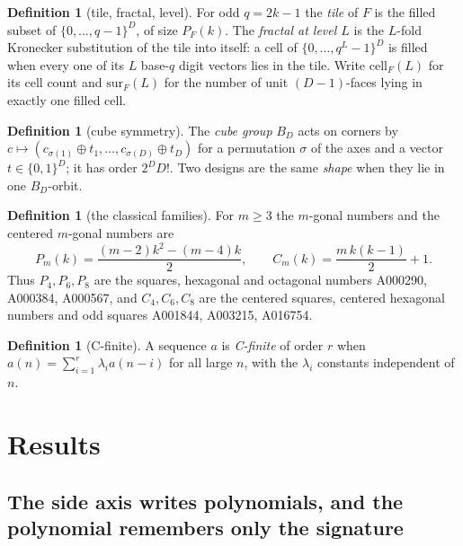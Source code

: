 \documentclass[11pt]{amsart}
\theoremstyle{definition}
\newtheorem{definition}[theorem]{Definition}
\theoremstyle{remark}
\begin{document}
\begin{definition}[tile, fractal, level]
\label{def:level}
For odd $q = 2k-1$ the \emph{tile} of $F$ is the filled subset of $\{0,\dots,q-1\}^{D}$, of size $P_{F}(k)$. The \emph{fractal at level $L$} is the $L$-fold Kronecker substitution of the tile into itself: a cell of $\{0,\dots,q^{L}-1\}^{D}$ is filled when every one of its $L$ base-$q$ digit vectors lies in the tile. Write $\mathrm{cell}_{F}(L)$ for its cell count and $\mathrm{sur}_{F}(L)$ for the number of unit $(D-1)$-faces lying in exactly one filled cell.
\end{definition}

\begin{definition}[cube symmetry]
\label{def:sym}
The \emph{cube group} $B_{D}$ acts on corners by $c \mapsto (c_{\sigma(1)} \oplus t_{1},\dots,c_{\sigma(D)} \oplus t_{D})$ for a permutation $\sigma$ of the axes and a vector $t \in \{0,1\}^{D}$; it has order $2^{D}D!$. Two designs are the same \emph{shape} when they lie in one $B_{D}$-orbit.
\end{definition}

\begin{definition}[the classical families]
\label{def:classical}
For $m \ge 3$ the $m$-gonal numbers and the centered $m$-gonal numbers are
\[
  P_{m}(k) = \frac{(m-2)k^{2}-(m-4)k}{2},
  \qquad
  C_{m}(k) = \frac{m\,k(k-1)}{2}+1 .
\]
Thus $P_{4},P_{6},P_{8}$ are the squares, hexagonal and octagonal numbers A000290, A000384, A000567, and $C_{4},C_{6},C_{8}$ are the centered squares, centered hexagonal numbers and odd squares A001844, A003215, A016754.
\end{definition}

\begin{definition}[C-finite]
\label{def:cfinite}
A sequence $a$ is \emph{C-finite} of order $r$ when $a(n) = \sum_{i=1}^{r}\lambda_{i}a(n-i)$ for all large $n$, with the $\lambda_{i}$ constants independent of $n$.
\end{definition}

\section{Results}
\label{sec:res}

\subsection*{The side axis writes polynomials, and the polynomial remembers only the signature}
\end{document}
